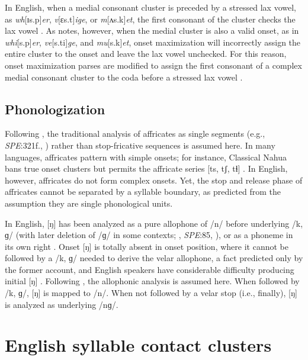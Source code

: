 \documentclass[12pt]{article}
\begin{document}
In English, when a medial consonant cluster is preceded by a stressed lax vowel, as \emph{wh}[ɪs.p]\emph{er}, \emph{v}[ɛs.t]\emph{ige}, or \emph{m}[ʌs.k]\emph{et}, the first consonant of the cluster checks the lax vowel \citep[3]{Hammond1997}. As \citet[55]{Harris1994} notes, however, when the medial cluster is also a valid onset, as in \emph{whi}[s.p]\emph{er}, \emph{ve}[s.ti]\emph{ge}, and \emph{mu}[s.k]\emph{et}, onset maximization will incorrectly assign the entire cluster to the onset and leave the lax vowel unchecked. For this reason, onset maximization parses are modified to assign the first consonant of a complex medial consonant cluster to the coda before a stressed lax vowel \citep[48]{Pulgram1970}.

\subsection{Phonologization}

Following \citet{Pierrehumbert1994}, the traditional analysis of affricates as single segments (e.g., \emph{SPE}:321f., \citealp[24]{Jakobson1961}) rather than stop-fricative sequences \citep[e.g.,][]{Hualde1988,Lombardi1990} is assumed here. In many languages, affricates pattern with simple onsets; for instance, Classical Nahua bans true onset clusters but permits the affricate series [ts, tʃ, tɬ] \citep[9]{Launey2011}. In English, however, affricates do not form complex onsets. Yet, the stop and release phase of affricates cannot be separated by a syllable boundary, as predicted from the assumption they are single phonological units.

In English, [ŋ] has been analyzed as a pure allophone of /n/ before underlying /k, ɡ/ (with later deletion of /ɡ/ in some contexts; \citealt[65f.]{Borowsky1986}, \emph{SPE}:85, \citealt[62]{Halle1985a}), or as a phoneme in its own right \citep[e.g.,][]{Jusczyk2002,Sapir1925}. Onset [ŋ] is totally absent in onset position, where it cannot be followed by a /k, ɡ/ needed to derive the velar allophone, a fact predicted only by the former account, and English speakers have considerable difficulty producing initial [ŋ] \citep{Rusaw2009}. Following \citet{Pierrehumbert1994}, the allophonic analysis is assumed here. When followed by /k, ɡ/, [ŋ] is mapped to /n/. When not followed by a velar stop (i.e., finally), [ŋ] is analyzed as underlying /nɡ/.

\section{English syllable contact clusters}
\label{clusters}
\end{document}
